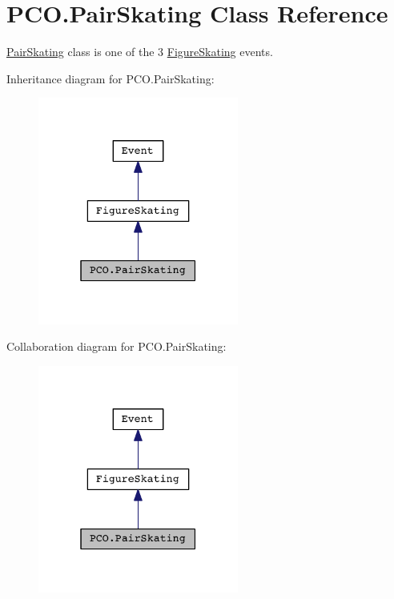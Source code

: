 \hypertarget{classPCO_1_1PairSkating}{\section{P\+C\+O.\+Pair\+Skating Class Reference}
\label{classPCO_1_1PairSkating}
}


\hyperlink{classPCO_1_1PairSkating}{Pair\+Skating} class is one of the 3 \hyperlink{classPCO_1_1FigureSkating}{Figure\+Skating} events.  




Inheritance diagram for P\+C\+O.\+Pair\+Skating\+:\nopagebreak
\begin{figure}[H]
\begin{center}
\leavevmode
\includegraphics[width=187pt]{classPCO_1_1PairSkating__inherit__graph}
\end{center}
\end{figure}


Collaboration diagram for P\+C\+O.\+Pair\+Skating\+:\nopagebreak
\begin{figure}[H]
\begin{center}
\leavevmode
\includegraphics[width=187pt]{classPCO_1_1PairSkating__coll__graph}
\end{center}
\end{figure}

